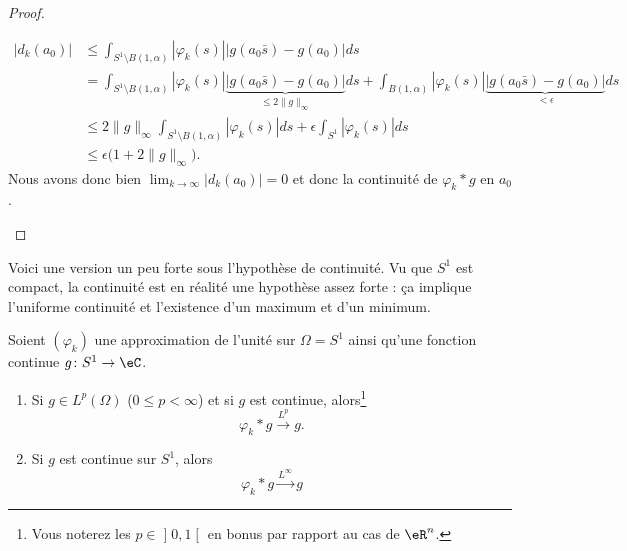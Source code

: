 \begin{proof}
\begin{subproof}
            \begin{subequations}
                \begin{align}
                    | d_k(a_0) |&\leq \int_{S^1\setminus B(1,\alpha)}| \varphi_k(s) |\big| g(a_0\bar s)-g(a_0) \big|ds\\
                    &=\int_{S^1\setminus B(1,\alpha)}| \varphi_k(s) |\underbrace{\big| g(a_0\bar s)-g(a_0) \big|}_{\leq 2\| g \|_{\infty}}ds+\int_{B(1,\alpha)}| \varphi_k(s) |\underbrace{\big| g(a_0\bar s)-g(a_0) \big|}_{<\epsilon}ds\\
                    &\leq 2\| g \|_{\infty}\int_{S^1\setminus B(1,\alpha)}| \varphi_k(s) |ds+\epsilon\int_{S^1}| \varphi_k(s) |ds\\
                    &\leq \epsilon\big( 1+2\| g \|_{\infty} \big).
                \end{align}
            \end{subequations}
            Nous avons donc bien \( \lim_{k\to \infty} | d_k(a_0) |=0\) et donc la continuité de \( \varphi_k*g\) en \( a_0\).

    \end{subproof}
\end{proof}

Voici une version un peu forte sous l'hypothèse de continuité. Vu que \( S^1\) est compact, la continuité est en réalité une hypothèse assez forte : ça implique l'uniforme continuité et l'existence d'un maximum et d'un minimum.
\begin{proposition}
    Soient \( (\varphi_k)\) une approximation de l'unité sur \( \Omega=S^1\) ainsi qu'une fonction continue \( g\colon S^1\to \eC\).
    \begin{enumerate}
        \item       \label{ITEMooPHBJooOHDVoW}
        Si \( g\in L^p(\Omega)\) (\( 0\leq p<\infty\)) et si \( g\) est continue, alors\footnote{Vous noterez les \( p\in \mathopen] 0 , 1 \mathclose[\) en bonus par rapport au cas de \( \eR^n\).}
            \begin{equation}
                \varphi_k*g\stackrel{L^p}{\to}g.
            \end{equation}
        \item       \label{ITEMooLOSVooDtaugF}
            Si \( g\) est continue sur \( S^1\), alors
            \begin{equation}
                \varphi_k*g\stackrel{L^{\infty}}{\to}g
            \end{equation}
    \end{enumerate}
\end{proposition}

